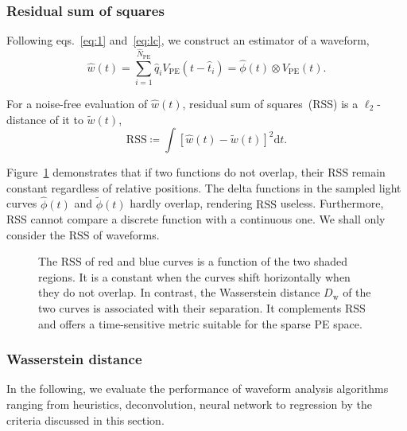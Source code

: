 \subsubsection{Residual sum of squares}
\label{sec:rss}

Following eqs.~\eqref{eq:1} and~\eqref{eq:lc}, we construct an estimator of a waveform,
\begin{equation}
  \label{eq:w-hat}
  \hat{w}(t) = \sum_{i=1}^{\hat{N}_\mathrm{PE}}\hat{q}_i V_\mathrm{PE}(t-\hat{t}_i) = \hat{\phi}(t) \otimes V_\mathrm{PE}(t).
\end{equation}

For a noise-free evaluation of $\hat{w}(t)$, residual sum of squares~(RSS) is a $\ell_2$-distance of it to $\tilde{w}(t)$,
\begin{equation}
  \label{eq:rss}
  \mathrm{RSS} \coloneqq\int\left[\hat{w}(t) - \tilde{w}(t)\right]^2\mathrm{d}t.
\end{equation}

Figure~\ref{fig:l2} demonstrates that if two functions do not overlap, their $\mathrm{RSS}$ remain constant regardless of relative positions.  The delta functions in the sampled light curves $\hat{\phi}(t)$ and $\tilde{\phi}(t)$ hardly overlap, rendering $\mathrm{RSS}$ useless.  Furthermore, RSS cannot compare a discrete function with a continuous one.  We shall only consider the $\mathrm{RSS}$ of waveforms.

\begin{figure}[H]
  \centering
  \resizebox{0.6\textwidth}{!}{}
  \caption{\label{fig:l2} The $\mathrm{RSS}$ of red and blue curves is a function of the two shaded regions. It is a constant when the curves shift horizontally when they do not overlap.  In contrast, the Wasserstein distance $D_\mathrm{w}$ of the two curves is associated with their separation.  It complements $\mathrm{RSS}$ and offers a time-sensitive metric suitable for the sparse PE space.}
\end{figure}

\subsubsection{Wasserstein distance}
\label{sec:W-dist}



In the following, we evaluate the performance of waveform analysis algorithms ranging from heuristics, deconvolution, neural network to regression by the criteria discussed in this section.

